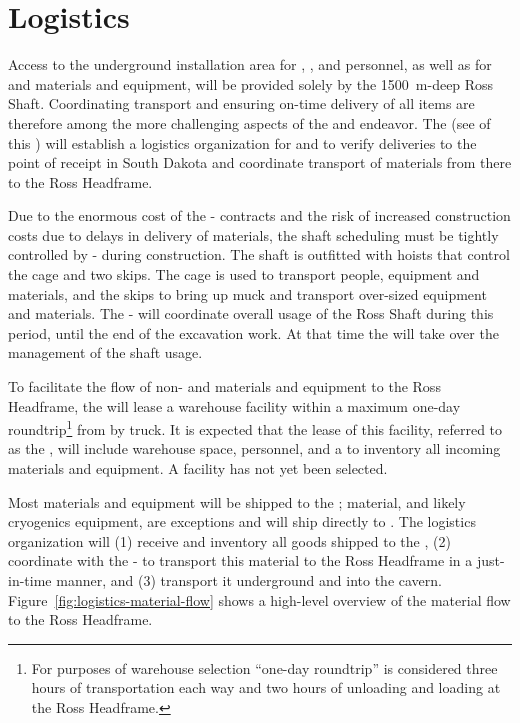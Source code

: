 \section{Logistics}
\label{sec:fdsp-tc-log}

Access to the underground installation area for ,   , and  personnel, as well as for   and   materials and equipment, will be provided solely by the \SI{1500}{m}-deep Ross Shaft. Coordinating transport and ensuring on-time delivery of all items are therefore among the more challenging aspects of the  and  endeavor. 
The  (see \tcchjpo %
of this ) will establish a logistics organization for  and  to verify deliveries to the point of receipt in South Dakota and coordinate transport of materials from there  to the Ross Headframe.   


Due to the enormous cost of the - contracts and the risk of increased construction costs due to delays in delivery of materials, the shaft scheduling must be tightly controlled by - during construction.
The shaft is outfitted with hoists that control the cage and two skips. The cage is used to transport people, equipment and materials, and the skips to bring up muck and transport over-sized equipment and materials. The -  will coordinate overall usage of the Ross Shaft during this period, until the end of the excavation work. At that  time the  will take over the management of the shaft usage.


To facilitate the flow of non-  and  materials and equipment to the Ross Headframe, the  will lease a warehouse facility within a maximum one-day roundtrip\footnote{For purposes of warehouse selection ``one-day roundtrip'' is considered three hours of transportation each way and two hours of unloading and loading at the Ross Headframe.} from  by truck. 
It is expected that the lease of this facility, referred to as the , will include warehouse space, personnel, and a  to inventory all incoming materials and equipment. 
A facility has not yet been selected. 


Most materials and equipment will be shipped to the ;  material, and likely cryogenics equipment, are exceptions and will ship directly to . 
The  logistics  organization will (1) receive and inventory all  goods shipped to the , (2) coordinate with the -  to transport this material to the Ross Headframe in a just-in-time manner, and (3) transport it underground and into the cavern. 
Figure~\ref{fig:logistics-material-flow} shows a high-level overview of the material flow to the Ross Headframe.


